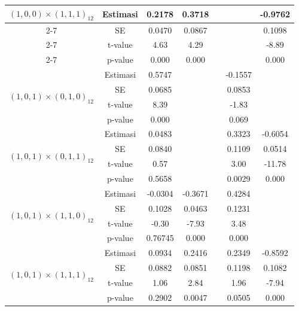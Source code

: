 \begin{enumerate}[label=\alph*.]
\begin{longtable}{|c|c|c|c|c|c|c|}
            \multirow{4}{*}{$(1,0,0)\times(1,1,1)_{12}$}
            & Estimasi & 0.2178 & 0.3718 &  &  & -0.9762 \\ \cline{2-7}
            & SE       & 0.0470 & 0.0867 &  &  & 0.1098  \\ \cline{2-7}
            & t-value  & 4.63   & 4.29   &  &  & -8.89  \\ \cline{2-7}
            & p-value  & 0.000  & 0.000  &  &  & 0.000  \\ \hline

            \multirow{4}{*}{$(1,0,1)\times(0,1,0)_{12}$}
            & Estimasi & 0.5747 &  &  & -0.1557 &  \\ \cline{2-7}
            & SE       & 0.0685 &  &  & 0.0853  &  \\ \cline{2-7}
            & t-value  & 8.39   &  &  & -1.83  &  \\ \cline{2-7}
            & p-value  & 0.000  &  &  & 0.069  &  \\ \hline

            \multirow{4}{*}{$(1,0,1)\times(0,1,1)_{12}$}
            & Estimasi & 0.0483 &  &  & 0.3323 & -0.6054 \\ \cline{2-7}
            & SE       & 0.0840 &  &  & 0.1109 & 0.0514  \\ \cline{2-7}
            & t-value  & 0.57   &  &  & 3.00   & -11.78 \\ \cline{2-7}
            & p-value  & 0.5658 &  &  & 0.0029 & 0.000  \\ \hline

            \multirow{4}{*}{$(1,0,1)\times(1,1,0)_{12}$}
            & Estimasi & -0.0304 & -0.3671 &  & 0.4284 &  \\ \cline{2-7}
            & SE       & 0.1028  & 0.0463  &  & 0.1231 &  \\ \cline{2-7}
            & t-value  & -0.30   & -7.93   &  & 3.48   &  \\ \cline{2-7}
            & p-value  & 0.76745 & 0.000   &  & 0.000  &  \\ \hline

            \multirow{4}{*}{$(1,0,1)\times(1,1,1)_{12}$}
            & Estimasi & 0.0934 & 0.2416 &  & 0.2349 & -0.8592 \\ \cline{2-7}
            & SE       & 0.0882 & 0.0851 &  & 0.1198 & 0.1082  \\ \cline{2-7}
            & t-value  & 1.06   & 2.84   &  & 1.96   & -7.94  \\ \cline{2-7}
            & p-value  & 0.2902 & 0.0047 &  & 0.0505 & 0.000  \\ \hline


\end{longtable}
\end{enumerate}
